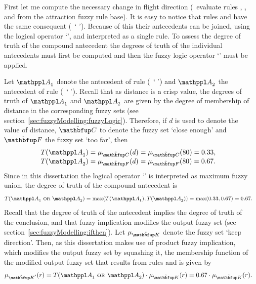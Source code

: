 First let me compute the necessary change in flight direction (\ie\ evaluate rules , ,  and  from the attraction fuzzy rule base). It is easy to notice that rules  and  have the same consequent (\ie\ `  '). Because of this their antecedents can be joined, using the logical operator `', and interpreted as a single rule. To assess the degree of truth of the compound antecedent the degrees of truth of the individual antecedents must first be computed and then the fuzzy logic operator `' must be applied. 

Let $\statement{A}_1$ denote the antecedent of rule  (\ie\ `  ') and $\statement{A}_2$ the antecedent of rule  (\ie\ `  '). Recall that as distance is a crisp value, the degrees of truth of $\statement{A}_1$ and $\statement{A}_2$ are given by the degree of membership of distance in the corresponding fuzzy sets (see section~\ref{sec:fuzzyModelling:fuzzyLogic}). Therefore, if $d$ is used to denote the value of distance, $\fset{C}$ to denote the fuzzy set `close enough' and $\fset{F}$ the fuzzy set `too far', then
%
\begin{equation}
\begin{array}{ll}
T(\statement{A}_1)=\mu_\fset{C}(d)=\mu_\fset{C}(80)=0.33, \\
T(\statement{A}_2)=\mu_\fset{F}(d)=\mu_\fset{F}(80)=0.67.
\end{array}
\end{equation}
%
Since in this dissertation the logical operator `' is interpreted as maximum fuzzy union, the degree of truth of the compound antecedent is 
%
\begin{equation}
T(\statement{A}_1\ \kwd{or}\ \statement{A}_2)=\max(T(\statement{A}_1),T(\statement{A}_2))=\max(0.33,0.67)=0.67.
\end{equation}
%
Recall that the degree of truth of the antecedent implies the degree of truth of the conclusion, and that fuzzy implication modifies the output fuzzy set (see section~\ref{sec:fuzzyModelling:ifthen}). Let $\mu_\fset{K}$ denote the fuzzy set `keep direction'. Then, as this dissertation makes use of product fuzzy implication, which modifies the output fuzzy set by squashing it, the membership function of the modified output fuzzy set that results from rules  and  is given by
%
\begin{equation}
\mu_{\fset{K}'}(r)=T(\statement{A}_1\ \kwd{or}\ \statement{A}_2) \cdot \mu_\fset{K}(r)=0.67 \cdot \mu_\fset{K}(r).
\end{equation}

